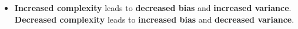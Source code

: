 \begin{itemize}
    \item[] {\bf Increased complexity} leads to {\bf decreased bias} and {\bf increased variance}. {\bf Decreased complexity} leads to {\bf increased bias} and {\bf decreased variance}.
\end{itemize}
